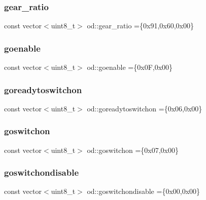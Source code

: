 \mbox{\label{namespaceod_af615192e30bab04a02f1aa4c21a48642}} 
\subsubsection{\texorpdfstring{gear\+\_\+ratio}{gear\_ratio}}
{\footnotesize\ttfamily const vector$<$uint8\+\_\+t$>$ od\+::gear\+\_\+ratio =\{0x91,0x60,0x00\}}

\mbox{\label{namespaceod_a74448ee88df5960df4c32613e7cdcd53}} 
\subsubsection{\texorpdfstring{goenable}{goenable}}
{\footnotesize\ttfamily const vector$<$uint8\+\_\+t$>$ od\+::goenable =\{0x0\+F,0x00\}}

\mbox{\label{namespaceod_a360cf2eae7cc59f7bd224fcf5992c767}} 
\subsubsection{\texorpdfstring{goreadytoswitchon}{goreadytoswitchon}}
{\footnotesize\ttfamily const vector$<$uint8\+\_\+t$>$ od\+::goreadytoswitchon =\{0x06,0x00\}}

\mbox{\label{namespaceod_a933f995790a17f6cdd3b54df8f7483a6}} 
\subsubsection{\texorpdfstring{goswitchon}{goswitchon}}
{\footnotesize\ttfamily const vector$<$uint8\+\_\+t$>$ od\+::goswitchon =\{0x07,0x00\}}

\mbox{\label{namespaceod_a12f3001ff096334fecb9c9749be4d1c2}} 
\subsubsection{\texorpdfstring{goswitchondisable}{goswitchondisable}}
{\footnotesize\ttfamily const vector$<$uint8\+\_\+t$>$ od\+::goswitchondisable =\{0x00,0x00\}}

